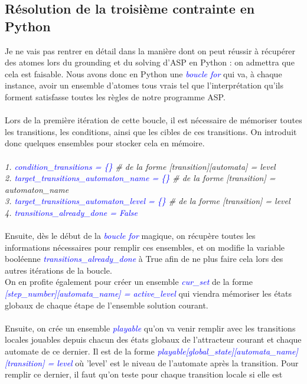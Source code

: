 \documentclass[12pt,a4paper]{article}
\begin{document}
\subsection{Résolution de la troisième contrainte en Python}
Je ne vais pas rentrer en détail dans la manière dont on peut réussir à récupérer des atomes lors du grounding et du solving d'ASP en Python : on admettra que cela est faisable. Nous avons donc en Python une 
\textcolor{blue}{\emph{boucle for}} qui va, à chaque instance, avoir un ensemble d'atomes tous vrais tel que l'interprétation qu'ils forment satisfasse toutes les règles de notre programme ASP.\\ \\
Lors de la première itération de cette boucle, il est nécessaire de mémoriser toutes les transitions, les conditions, ainsi que les cibles de ces transitions. On introduit donc quelques ensembles pour stocker cela en mémoire.\\ \\
\emph{
	1. \textcolor{blue}{condition\_transitions = \{\}} \# de la forme [transition][automata] = level\\
	2. \textcolor{blue}{target\_transitions\_automaton\_name = \{\}} \# de la forme [transition] = automaton\_name\\
	3. \textcolor{blue}{target\_transitions\_automaton\_level = \{\}}  \# de la forme [transition] = level\\
	4. \textcolor{blue}{transitions\_already\_done = False}\\ \\
}
Ensuite, dès le début de la \emph{\textcolor{blue}{boucle for}} magique, on récupère toutes les informations nécessaires pour remplir ces ensembles, et on modifie la variable booléenne \emph{\textcolor{blue}
{transitions\_already\_done}} à True afin de ne plus faire cela lors des autres itérations de la boucle.\\
On en profite également pour créer un ensemble \emph{\textcolor{blue}{cur\_set}}  de la forme \emph{\textcolor{blue}{[step\_number][automata\_name] = active\_level}} qui viendra mémoriser les états globaux de chaque étape de 
l'ensemble solution courant.\\ \\
Ensuite, on crée un ensemble \emph{\textcolor{blue}{playable}} qu'on va venir remplir avec les transitions locales jouables depuis chacun des états globaux de l'attracteur courant et chaque automate de ce dernier. Il est de la forme 
\emph{\textcolor{blue}{playable[global\_state][automata\_name][transition] = level}} où 'level' est le niveau de l'automate après la transition. Pour remplir ce dernier, il faut qu'on teste pour chaque transition locale si elle est 
\end{document}
